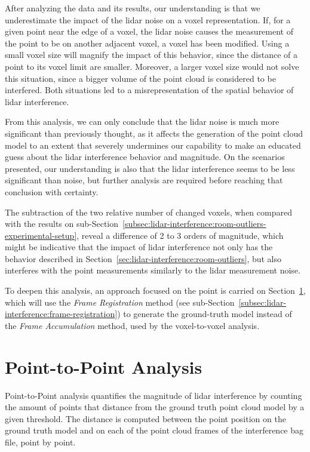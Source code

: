 After analyzing the data and its results, our understanding is that we underestimate the impact of the \ac{lidar} noise on a voxel representation. If, for a given point near the edge of a voxel, the \ac{lidar} noise causes the measurement of the point to be on another adjacent voxel, a voxel has been modified. Using a small voxel size will magnify the impact of this behavior, since the distance of a point to its voxel limit are smaller. Moreover, a larger voxel size would not solve this situation, since a bigger volume of the point cloud is considered to be interfered. Both situations led to a misrepresentation of the spatial behavior of \ac{lidar} interference. 

From this analysis, we can only conclude that the \ac{lidar} noise is much more significant than previously thought, as it affects the generation of the point cloud model to an extent that severely undermines our capability to make an educated guess about the \ac{lidar} interference behavior and magnitude. On the scenarios presented, our understanding is also that the \ac{lidar} interference seems to be less significant than noise, but further analysis are required before reaching that conclusion with certainty.

The subtraction of the two relative number of changed voxels, when compared with the results on sub-Section~\ref{subsec:lidar-interference:room-outliers-experimental-setup}, reveal a difference of 2 to 3 orders of magnitude, which might be indicative that the impact of \ac{lidar} interference not only has the behavior described in Section~\ref{sec:lidar-interference:room-outliers}, but also interferes with the point measurements similarly to the \ac{lidar} measurement noise.

To deepen this analysis, an approach focused on the point is carried on Section~\ref{sec:lidar-interference:point-to-point-analysis}, which will use the \textit{Frame Registration} method (see sub-Section~\ref{subsec:lidar-interference:frame-registration}) to generate the ground-truth model instead of the \textit{Frame Accumulation} method, used by the voxel-to-voxel analysis.



\section{Point-to-Point Analysis}
\label{sec:lidar-interference:point-to-point-analysis}
Point-to-Point analysis quantifies the magnitude of \ac{lidar} interference by counting the amount of points that distance from the ground truth point cloud model by a given threshold. The distance is computed between the point position on the ground truth model and on each of the point cloud frames of the interference bag file, point by point.

